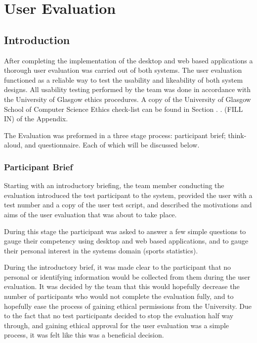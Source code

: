 \section{User Evaluation}

\subsection{Introduction}

After completing the implementation of the desktop and web based applications a
thorough user evaluation was carried out of both systems. The user evaluation
functioned as a reliable way to test the usability and likeability of both
system designs. All usability testing performed by the team was done in
accordance with the University of Glasgow ethics procedures. A copy of the
University of Glasgow School of Computer Science Ethics check-list can be found
in Section . . (FILL IN) of the Appendix.

The Evaluation was preformed in a three stage process: participant brief;
think-aloud, and questionnaire. Each of which will be discussed below.

\subsubsection{Participant Brief}

Starting with an introductory briefing, the team member conducting the
evaluation introduced the test participant to the system, provided the user
with a test number and a copy of the user test script, and described the
motivations and aims of the user evaluation that was about to take place.

During this stage the participant was asked to answer a few simple questions to
gauge their competency using desktop and web based applications, and to gauge
their personal interest in the systems domain (sports statistics).

During the introductory brief, it was made clear to the participant that no
personal or identifying information would be collected from them during the
user evaluation. It was decided by the team that this would hopefully decrease
the number of participants who would not complete the evaluation fully, and to
hopefully ease the process of gaining ethical permissions from the University.
Due to the fact that no test participants decided to stop the evaluation half
way through, and gaining ethical approval for the user evaluation was a simple
process, it was felt like this was a beneficial decision.

